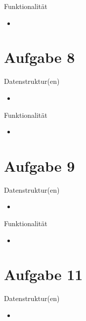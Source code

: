 \documentclass{beamer}
\begin{document}
    \begin{frame}{Funktionalität}
    	\begin{itemize}
    		\setlength\itemsep{1em}
    		\item 
    	\end{itemize}
    \end{frame}

    \section{Aufgabe 8}
    \begin{frame}{Datenstruktur(en)}
    	\begin{itemize}
    		\setlength\itemsep{1em}
    		\item 
    	\end{itemize}
    \end{frame}
    
    \begin{frame}{Funktionalität}
    	\begin{itemize}
    		\setlength\itemsep{1em}
    		\item 
    	\end{itemize}
    \end{frame}

    \section{Aufgabe 9}
    \begin{frame}{Datenstruktur(en)}
    	\begin{itemize}
    		\setlength\itemsep{1em}
    		\item 
    	\end{itemize}
    \end{frame}
    
    \begin{frame}{Funktionalität}
    	\begin{itemize}
    		\setlength\itemsep{1em}
    		\item 
    	\end{itemize}
    \end{frame}

    \section{Aufgabe 11}
    \begin{frame}{Datenstruktur(en)}
    	\begin{itemize}
    		\setlength\itemsep{1em}
    		\item 
    	\end{itemize}
    \end{frame}
    
\end{document}
